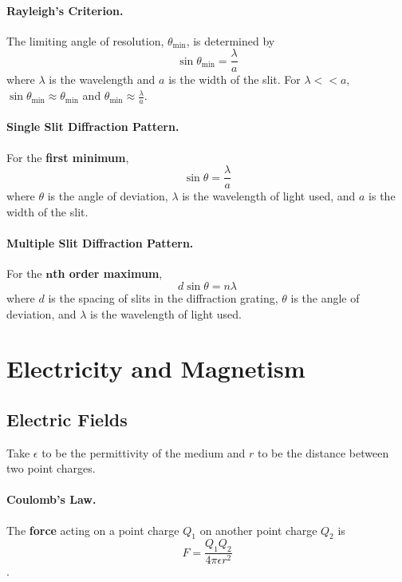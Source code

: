 \documentclass{article}
\begin{document}
\paragraph{Rayleigh's Criterion.} The limiting angle of resolution,
$\theta_{\text{min}}$, is determined by \begin{equation} \sin\theta_{\text{min}}
= \frac{\lambda}{a} \end{equation} where $\lambda$ is the wavelength and $a$ is
the width of the slit. For $\lambda << a$, $\sin\theta_{\text{min}} \approx
\theta_{\text{min}}$ and $\theta_{\text{min}} \approx \frac{\lambda}{a}$.

\paragraph{Single Slit Diffraction Pattern.} For the \textbf{first minimum},
\begin{equation} \sin\theta = \frac{\lambda}{a} \end{equation} where $\theta$ is
  the angle of deviation, $\lambda$ is the wavelength of light used, and $a$ is
  the width of the slit.

\paragraph{Multiple Slit Diffraction Pattern.} For the \textbf{$\mathbf{n}$th
order maximum}, \begin{equation} d\sin\theta = n\lambda \end{equation} where $d$
  is the spacing of slits in the diffraction grating, $\theta$ is the angle of
  deviation, and $\lambda$ is the wavelength of light used.

\section{Electricity and Magnetism}

\subsection{Electric Fields}

Take $\epsilon$ to be the permittivity of the medium and $r$ to be the distance
between two point charges.

\paragraph{Coulomb's Law.} The \textbf{force} acting on a point charge $Q_1$ on
another point charge $Q_2$ is \begin{equation} F = \frac{Q_1Q_2}{4\pi\epsilon
r^2} \end{equation}.
\end{document}
